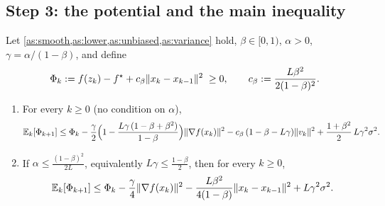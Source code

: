 \subsection{Step 3: the potential and the main inequality}

\begin{tcolorbox}[keybox]
\begin{theorem}\label{thm:master}
Let \cref{as:smooth,as:lower,as:unbiased,as:variance} hold, $\beta\in[0,1)$, $\alpha>0$,
$\gamma=\alpha/(1-\beta)$, and define
\begin{equation}\label{eq:potential}
  \Phi_k:=f(z_k)-f^\star+c_\beta\lVert x_k-x_{k-1}\rVert^2\;\ge0,\qquad c_\beta:=\frac{L\beta^2}{2(1-\beta)^2}.
\end{equation}
\begin{enumerate}[label=\textup{(\alph*)}]
\item For every $k\ge0$ (no condition on $\alpha$),
\begin{equation}\label{eq:master-general}
  \mathbb{E}_k[\Phi_{k+1}]\le\Phi_k
  -\frac\gamma2\Bigl(1-\frac{L\gamma\,(1-\beta+\beta^2)}{1-\beta}\Bigr)\lVert \nabla f(x_k)\rVert^2
  -c_\beta\,(1-\beta-L\gamma)\lVert v_k\rVert^2
  +\frac{1+\beta^2}{2}\,L\gamma^2\sigma^2 .
\end{equation}
\item If $\alpha\le\frac{(1-\beta)^2}{2L}$, equivalently $L\gamma\le\frac{1-\beta}{2}$, then
for every $k\ge0$,
\begin{equation}\label{eq:master}
  \mathbb{E}_k[\Phi_{k+1}]\le\Phi_k-\frac\gamma4\lVert \nabla f(x_k)\rVert^2
  -\frac{L\beta^2}{4(1-\beta)}\lVert x_k-x_{k-1}\rVert^2+L\gamma^2\sigma^2 .
\end{equation}
\end{enumerate}
\end{theorem}
\end{tcolorbox}

